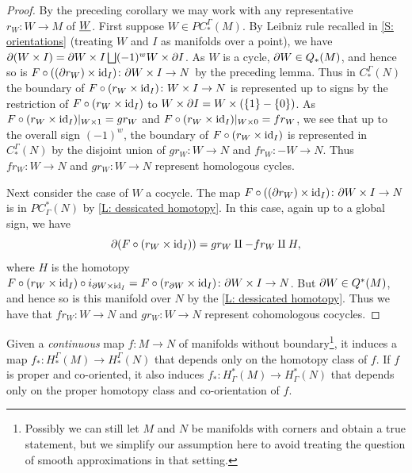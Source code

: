 \begin{proof}
	By the preceding corollary we may work with any representative $r_W \colon W \to M$ of $\underline{W}$.
	First suppose $W \in PC_*^\Gamma(M)$.
	By Leibniz rule recalled in \cref{S: orientations} (treating $W$ and $I$ as manifolds over a point), we have $\partial (W \times I) = \partial W \times I \bigsqcup (-1)^{w} W \times \partial I$.
	As $W$ is a cycle, $\partial W \in Q_*(M)$, and hence so is $F \circ ((\partial r_W) \times \mathrm{id}_I) \colon \partial W \times I \to N$ by the preceding lemma.
	Thus in $C^\Gamma_*(N)$ the boundary of $F \circ (r_W \times \mathrm{id}_I) \colon W \times I \to N$ is represented up to signs by the restriction of
	$F \circ (r_W \times \mathrm{id}_I)$ to $W \times \partial I = W \times (\{1\}-\{0\})$.
	As $F \circ (r_W \times \mathrm{id}_I)|_{W \times 1} = gr_W$ and $F \circ (r_W \times \mathrm{id}_I)|_{W \times 0} = fr_W$, we see that up to the overall sign $(-1)^{w}$, the boundary of $F \circ (r_W \times \mathrm{id}_I)$ is represented in $C_*^\Gamma(N)$ by the disjoint union of $gr_W \colon W \to N$ and $fr_W \colon -W \to N$.
	Thus $fr_W \colon W \to N$ and $gr_W \colon W \to N$ represent homologous cycles.

	Next consider the case of $W$ a cocycle.
	The map $F \circ ((\partial r_W) \times \mathrm{id}_I) \colon \partial W \times I \to N$ is in $PC^*_\Gamma(N)$ by \cref{L: dessicated homotopy}.
	In this case, again up to a global sign, we have $$\partial (F \circ (r_W \times \mathrm{id}_I)) = gr_W \amalg -fr_W \amalg H,$$ where $H$ is the homotopy $F \circ (r_W \times \mathrm{id}_I) \circ i_{\partial W \times \mathrm{id}_I} = F \circ (r_{\partial W} \times \mathrm{id}_I) \colon \partial W \times I \to N$.
	But $\partial W \in Q^*(M)$, and hence so is this manifold over $N$ by the \cref{L: dessicated homotopy}.
	Thus we have
	that $fr_W \colon W \to N$ and $gr_W \colon W \to N$ represent cohomologous cocycles.
\end{proof}

\begin{proposition}\label{P: homology homotopy functor}
	Given a \textit{continuous} map $f \colon M \to N$ of manifolds without boundary\footnote{Possibly we can still let $M$ and $N$ be manifolds with corners and obtain a true statement, but we simplify our assumption here to avoid treating the question of smooth approximations in that setting.}, it induces a map $f_* \colon H_*^\Gamma(M) \to H_*^\Gamma(N)$ that depends only on the homotopy class of $f$.
	If $f$ is proper and co-oriented, it also induces $f_* \colon H^*_\Gamma(M) \to H^*_\Gamma(N)$ that depends only on the proper homotopy class and co-orientation of $f$.
\end{proposition}

